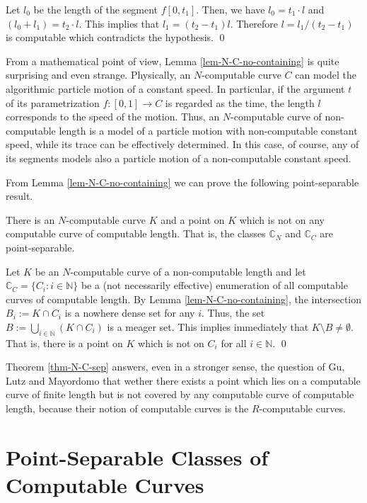\documentclass{LMCS}
\theoremstyle{plain}
\def\IC{\mathbb{C}}
\def\IN{\mathbb{N}}
\begin{document}
Let $l_0$ be the length of the segment $f[0, t_1]$. Then, we have $l_0= t_1\cdot l$ and $(l_0 +l_1) = t_2 \cdot l$. This implies that $l_1 =(t_2-t_1)l$. Therefore $l = l_1/(t_2-t_1)$ is computable which contradicts the hypothesis.
\qed

From a mathematical point of view, Lemma \ref{lem-N-C-no-containing} is quite surprising and even strange. Physically, an $N$-computable curve $C$ can model the algorithmic particle motion of a constant speed. In particular, if the argument $t$ of its parametrization $f:[0,1]\to C$ is regarded as the time, the length $l$ corresponds to the speed of the motion. Thus, an $N$-computable curve of non-computable length is a model of a particle motion with non-computable constant speed, while its trace can be effectively determined. In this case, of course, any of its segments models also a particle motion of a non-computable constant speed.

From Lemma \ref{lem-N-C-no-containing} we can prove the following point-separable result.

\begin{thm}\label{thm-N-C-sep}
There is an $N$-computable curve $K$ and a point on $K$ which is not on any computable curve of computable length. That is, the classes $\IC_N$ and $\IC_C$ are point-separable.
\end{thm}

\proof
Let $K$ be an $N$-computable curve of a non-computable length and let $\IC_C =\{C_i: i\in\IN\}$ be a (not necessarily effective) enumeration of all computable curves of computable length. By Lemma \ref{lem-N-C-no-containing}, the intersection $B_i := K \cap C_i$ is a nowhere dense set for any $i$. Thus, the set $B := \bigcup_{i\in\IN} (K \cap C_i)$ is a meager set. This implies immediately that $K \setminus B \neq \emptyset$. That is, there is a point on $K$ which is not on $C_i$ for all $i\in\IN$.
\qed

Theorem \ref{thm-N-C-sep} answers, even in a stronger sense, the question of Gu, Lutz and Mayordomo \cite{GLM11} that wether there exists a point which lies on a computable curve of finite length but is not covered by any computable curve of computable length, because their notion of computable curves
is the $R$-computable curves.


\section{Point-Separable Classes of Computable Curves}\label{sec-main}
\end{document}
